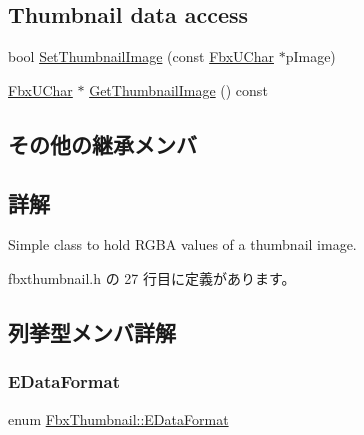 \subsection*{Thumbnail data access}
\begin{DoxyCompactItemize}
\item 
bool \hyperlink{class_fbx_thumbnail_a44c5615f4a4428a158787f3cd4e02997}{Set\+Thumbnail\+Image} (const \hyperlink{fbxtypes_8h_a1be3cadf61e76f49142eb83e66ffe8bd}{Fbx\+U\+Char} $\ast$p\+Image)
\item 
\hyperlink{fbxtypes_8h_a1be3cadf61e76f49142eb83e66ffe8bd}{Fbx\+U\+Char} $\ast$ \hyperlink{class_fbx_thumbnail_aade1213f9f4322aca855cd24de720c14}{Get\+Thumbnail\+Image} () const
\end{DoxyCompactItemize}
\subsection*{その他の継承メンバ}


\subsection{詳解}
Simple class to hold R\+G\+BA values of a thumbnail image. 

 fbxthumbnail.\+h の 27 行目に定義があります。



\subsection{列挙型メンバ詳解}
\mbox{\label{class_fbx_thumbnail_a60bdaa7e6f78e26f4a8810c552958a0a}} 
\subsubsection{\texorpdfstring{E\+Data\+Format}{EDataFormat}}
{\footnotesize\ttfamily enum \hyperlink{class_fbx_thumbnail_a60bdaa7e6f78e26f4a8810c552958a0a}{Fbx\+Thumbnail\+::\+E\+Data\+Format}}

